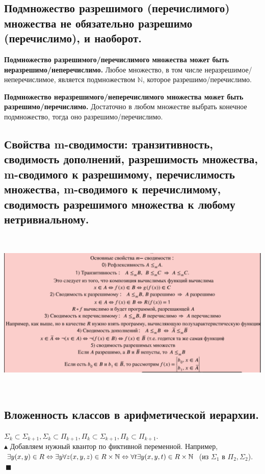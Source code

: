 \subsection{Подмножество разрешимого (перечислимого) множества не обязательно разрешимо (перечислимо), и наоборот.}
\textbf{Подмножество разрешимого/перечислимого множества может быть неразрешимо/неперечислимо.}
Любое множество, в том числе неразрешимое/неперечислимое, является подмножеством $\mathbb{N}$, которое разрешимо/перечислимо.

\textbf{Подмножество неразрешимого/неперечислимого множества может быть разрешимо/перечислимо.}
Достаточно в любом множестве выбрать конечное подмножество, тогда оно разрешимо/перечислимо.

\subsection{Свойства m-сводимости: транзитивность, сводимость дополнений, разрешимость множества, m-сводимого к разрешимому, перечислимость множества, m-сводимого к перечислимому, сводимость разрешимого множества к любому нетривиальному.}
\begin{center}
    \includegraphics[width = 17cm, height = 8cm]{images/3 (определения)_m34.PNG}
\end{center}

\subsection{Вложенность классов в арифметической иерархии.}
$\Sigma_k \subset \Sigma_{k+1}, \Sigma_k \subset \Pi_{k+1}, \Pi_k \subset \Sigma_{k+1}, \Pi_k \subset \Pi_{k+1}.$\\
$ \blacktriangle$ Добавляем нужный квантор по фиктивной переменной. Например, $\exists y (x,y) \in R \Leftrightarrow \exists y \forall z (x,y,z)\in R \times \mathbb{N} \Leftrightarrow \forall t \exists y (x,y,t) \in R\times \mathbb{N}$ (из $\Sigma_1$ в $\Pi_2, \Sigma_2$). $\ \blacksquare$

